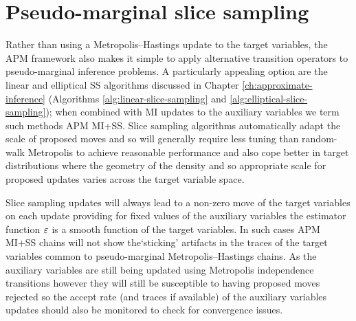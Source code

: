 
\section{Pseudo-marginal slice sampling}

Rather than using a Metropolis--Hastings update to the target variables, the \ac{APM} framework also makes it simple to apply alternative transition operators to pseudo-marginal inference problems. A particularly appealing option are the linear and elliptical \ac{SS} algorithms discussed in Chapter \ref{ch:approximate-inference} (Algorithms \ref{alg:linear-slice-sampling} and \ref{alg:elliptical-slice-sampling}); when combined with \ac{MI} updates to the auxiliary variables we term such methods \ac{APM} \ac{MI}+\ac{SS}. Slice sampling algorithms automatically adapt the scale of proposed moves and so will generally require less tuning than random-walk Metropolis to achieve reasonable performance and also cope better in target distributions where the geometry of the density and so appropriate scale for proposed updates varies across the target variable space.

Slice sampling updates will always lead to a non-zero move of the target variables on each update providing for fixed values of the auxiliary variables the estimator function $\varepsilon$ is a smooth function of the target variables. In such cases \ac{APM} \ac{MI}+\ac{SS} chains will not show the`sticking' artifacts in the traces of the target variables common to pseudo-marginal Metropolis--Hastings chains. As the auxiliary variables are still being updated using Metropolis independence transitions however they will still be susceptible to having proposed moves rejected so the accept rate (and traces if available) of the auxiliary variables updates should also be monitored to check for convergence issues. %
	
